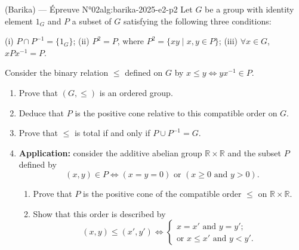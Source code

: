 \newpage

\begin{problem}{(Barika) — Épreuve N°02}{alg:barika-2025-e2-p2}
Let $G$ be a group with identity element $1_G$ and $P$ a subset of $G$ satisfying
the following three conditions:

(i) $P \cap P^{-1} = \{1_G\}$; (ii) $P^2 = P$, where $P^2 = \{xy \mid x, y \in P\}$;
(iii) $\forall x \in G$, $xPx^{-1} = P$.

Consider the binary relation $\leq$ defined on $G$ by
$x \leq y \Leftrightarrow yx^{-1} \in P$.
\begin{enumerate}
\item Prove that $(G, \leq)$ is an ordered group.
\item Deduce that $P$ is the positive cone relative to this compatible order on $G$.
\item Prove that $\leq$ is total if and only if $P \cup P^{-1} = G$.
\item \textbf{Application:} consider the additive abelian group
      $\mathbb{R} \times \mathbb{R}$ and the subset $P$ defined by
      $$
      (x, y) \in P \Leftrightarrow (x = y = 0) \text{ or } (x \geq 0 \text{ and } y > 0).
      $$
      \begin{enumerate}
      \item Prove that $P$ is the positive cone of the compatible order $\leq$ on
            $\mathbb{R} \times \mathbb{R}$.
      \item Show that this order is described by
            $$
            (x, y) \leq (x', y') \Leftrightarrow
            \begin{cases} x = x' \text{ and } y = y'; \\
            \text{or } x \leq x' \text{ and } y < y'. \end{cases}
            $$
      \end{enumerate}
\end{enumerate}

\end{problem}

\newpage

